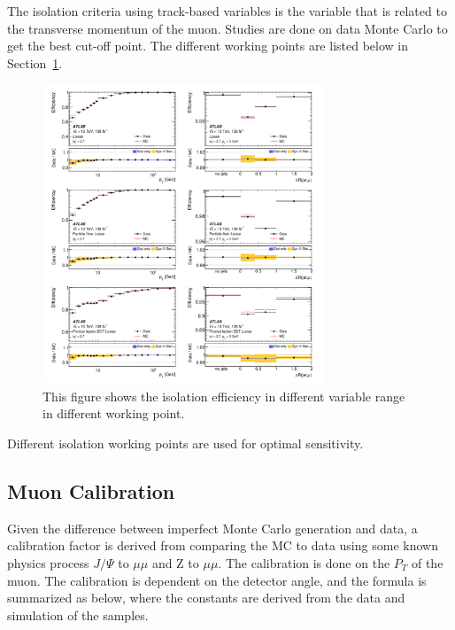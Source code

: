 The isolation criteria using track-based variables is the variable that is related to the transverse momentum of the muon. Studies are done on data Monte Carlo to get the best cut-off point. The different working points are listed below in Section~\ref{fig:isolationWP}.


\begin{figure}[!htb]
    \begin{center}
        \includegraphics[width=0.75\textwidth]{figures/common_ana/IsolationEff1}
        \caption{
            This figure shows the isolation efficiency in different variable range in different working point\cite{Aad:2746302}.
        }
        \label{fig:isolationWP}
    \end{center}
\end{figure}

Different isolation working points are used for optimal sensitivity. 


\subsection{Muon Calibration}
Given the difference between imperfect Monte Carlo generation and data, a calibration factor is derived from comparing the MC to data using some known physics process $J/\Psi$ to $\mu \mu$ and Z to $\mu \mu$. The calibration is done on the $P_{T}$ of the muon. 
The calibration is dependent on the detector angle, and the formula is summarized as below, where the constants are derived from the data and simulation of the samples.

